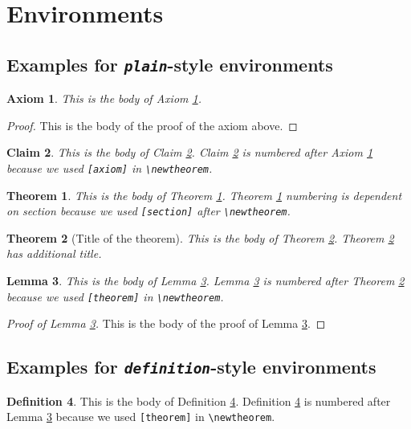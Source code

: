 \documentclass[bj,authoryear]{imsart}
\theoremstyle{plain}
\newtheorem{axiom}{Axiom}
\newtheorem{claim}[axiom]{Claim}
\newtheorem{theorem}{Theorem}[section]
\newtheorem{lemma}[theorem]{Lemma}
\theoremstyle{definition}
\newtheorem{definition}[theorem]{Definition}
\begin{document}
\section{Environments}

\subsection{Examples for \emph{\texttt{plain}}-style environments}
\begin{axiom}\label{ax1}
This is the body of Axiom \ref{ax1}.
\end{axiom}

\begin{proof}
This is the body of the proof of the axiom above.
\end{proof}

\begin{claim}\label{cl1}
This is the body of Claim \ref{cl1}. Claim \ref{cl1} is numbered after
Axiom \ref{ax1} because we used \verb|[axiom]| in \verb|\newtheorem|.
\end{claim}

\begin{theorem}\label{th1}
This is the body of Theorem \ref{th1}. Theorem \ref{th1} numbering is
dependent on section because we used \verb|[section]| after \verb|\newtheorem|.
\end{theorem}

\begin{theorem}[Title of the theorem]\label{th2}
This is the body of Theorem \ref{th2}. Theorem \ref{th2} has additional title.
\end{theorem}

\begin{lemma}\label{le1}
This is the body of Lemma \ref{le1}. Lemma \ref{le1} is numbered after
Theorem \ref{th2} because we used \verb|[theorem]| in \verb|\newtheorem|.
\end{lemma}


\begin{proof}[Proof of Lemma \ref{le1}]
This is the body of the proof of Lemma \ref{le1}.
\end{proof}

\subsection{Examples for \emph{\texttt{definition}}-style environments}
\begin{definition}\label{de1}
This is the body of Definition \ref{de1}. Definition \ref{de1} is numbered after
Lemma \ref{le1} because we used \verb|[theorem]| in \verb|\newtheorem|.
\end{definition}
\end{document}
